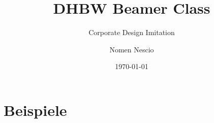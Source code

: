 \documentclass[smaller]{DHBW} %
\title{DHBW Beamer Class}
\subtitle{Corporate Design Imitation}
\author{Nomen Nescio}
\institute[DHBW Karlsruhe]{karlsruhe.dhbw.de}
\date{\today}
\begin{document}
	\part{Beispiele}
	
\end{document}
